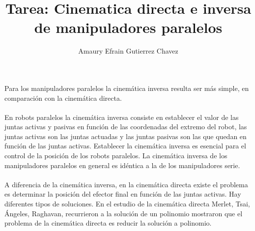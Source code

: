 \documentclass[12pt,a4paper]{article}
\title{Tarea: Cinematica directa e inversa de manipuladores paralelos}
\author{Amaury Efrain Gutierrez Chavez}
\begin{document}
\maketitle
Para los manipuladores paralelos la cinemática inversa resulta ser más simple, en comparación con la cinemática directa.\\
\\
En robots paralelos la cinemática inversa consiste en establecer el valor de las juntas activas y pasivas en función de las coordenadas del extremo del robot, las juntas activas son las juntas actuadas y las juntas pasivas son las que quedan en función de las juntas activas. Establecer la cinemática inversa es esencial para el control de la posición de los robots paralelos. La cinemática inversa de los manipuladores paralelos en general es idéntica a la de los manipuladores serie.\\
\\
A diferencia de la cinemática inversa, en la cinemática directa existe el problema es determinar la posición del efector final en función de las juntas activas. Hay diferentes tipos de soluciones. En el estudio de la cinemática directa Merlet, Tsai, Ángeles, Raghavan, recurrieron a la solución de un polinomio mostraron que el problema de la cinemática directa es reducir la solución a polinomio.
\end{document}
